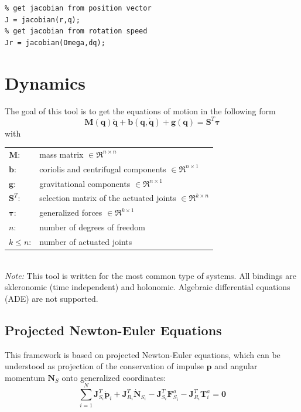 \begin{lstlisting}
% get jacobian from position vector
J = jacobian(r,q);
% get jacobian from rotation speed
Jr = jacobian(Omega,dq); 
\end{lstlisting}


\clearpage
\section{Dynamics}
The goal of this tool is to get the equations of motion in the following form
\begin{equation}\label{eq:eom}
\mathbf{M}\left(\mathbf{q}\right) \ddot{\mathbf{q}} + \mathbf{b}\left(\mathbf{q},\dot{\mathbf{q}}\right) + \mathbf{g}\left(\mathbf{q}\right) = \mathbf{S}^T \boldsymbol{\tau}
\end{equation}
with 
\\

\begin{tabular}{ll}
$\mathbf{M}$: & mass matrix $\in \Re^{n\times n}$\\
$\mathbf{b}$: & coriolis and centrifugal components $\in \Re^{n\times 1}$\\
$\mathbf{g}$: & gravitational components $\in \Re^{n\times 1}$\\
$\mathbf{S}^T$: & selection matrix of the actuated joints $\in \Re^{k\times n}$\\
$\boldsymbol{\tau}$: & generalized forces $\in \Re^{k\times 1}$ \\
$n$: & number of degrees of freedom \\
$k\leq n$: & number of actuated joints
\end{tabular} 
\\
\textit{Note:} This tool is written for the most common type of systems. All bindings are skleronomic (time independent) and holonomic.  Algebraic differential equations (ADE) are not supported.

\subsection{Projected Newton-Euler Equations}
This framework is based on projected Newton-Euler equations, which can be understood as projection of the conservation of impulse $\mathbf{p}$ and angular momentum $\mathbf{N}_S$ onto generalized coordinates:
\begin{equation}
\sum_{i=1}^N{\mathbf{J}_{S_i}^T \dot{\mathbf{p}}_i + \mathbf{J}_{R_i}^T \dot{\mathbf{N}}_{S_i} - \mathbf{J}_{S_i}^T\mathbf{F}^a_{S_i}} - \mathbf{J}_{R_i}^T\mathbf{T}^a_i = \mathbf{0}
\end{equation}

